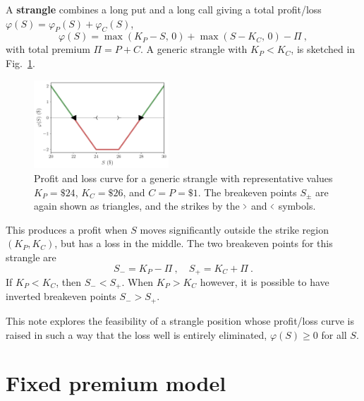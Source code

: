 \documentclass[aps,reprint]{revtex4-2}
\begin{document}
A \textbf{strangle} combines a long put and a long call giving a total profit/loss
$\varphi(S)= \varphi_P(S) + \varphi_C(S)$,
\begin{equation}
\varphi(S) = \max(K_P - S,\,0) + \max(S - K_C,\,0) - \Pi~,
\end{equation}
with total premium $\Pi = P + C$.  
A generic strangle with $K_P < K_C$, is sketched in Fig.~\ref{fig:strangle}.
\begin{figure}[hb]
    \centering
    \includegraphics[width=0.45\textwidth]{figs/strangle.pdf}
    \caption{Profit and loss curve for a generic strangle with representative values
    $K_P = \$24$, $K_C = \$26$, and $C = P = \$1$.
    The breakeven points $S_\pm$ are again shown as triangles, and the strikes by the $ \scalebox{0.5}[1]{$>$} $ and $\scalebox{0.5}[1]{$<$}$ symbols. }
    \label{fig:strangle}
\end{figure}
This produces a profit when $S$ moves significantly outside the strike region $(K_P, K_C)$, but has a loss in the middle. 
The two breakeven points for this strangle are
\begin{equation}
S_{-} = K_P - \Pi~, 
\quad 
S_{+} = K_C + \Pi~.
\end{equation}
If $K_P < K_C$, then $S_{-} < S_{+}$.  When $K_P > K_C$ however, it is possible to have inverted breakeven points $S_{-} > S_{+}$.

This note explores the feasibility of a strangle position whose profit/loss curve is raised in such a way that the loss well is entirely eliminated,  $\varphi(S) \geq 0$ for all $S$. 

\section{Fixed premium model}
\end{document}

